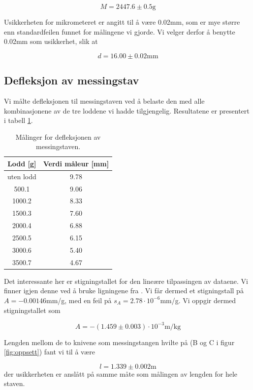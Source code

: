 \documentclass[a4paper,11pt, twocolumn]{article}
\begin{document}
\begin{equation}
	M = 2447.6\pm0.5\text{g}
\end{equation} 

Usikkerheten for mikrometeret er angitt til å være 0.02mm, som er mye større enn standardfeilen funnet for målingene vi gjorde. Vi velger derfor å benytte 0.02mm som usikkerhet, slik at

\begin{equation}
	d = 16.00\pm0.02\text{mm}
\end{equation}

\subsection{Defleksjon av messingstav}
Vi målte defleksjonen til messingstaven ved å belaste den med alle kombinasjonene av de tre loddene vi hadde tilgjengelig. Resultatene er presentert i tabell \ref{tab:defleksjon}.
\begin{table}[!ht]
\centering
\caption{Målinger for defleksjonen av messingstaven.}
\label{tab:defleksjon}
\begin{tabular}{cc}
	\toprule
	\toprule
	Lodd [g] & Verdi måleur [mm]\\
	\hline
	uten lodd & 9.78\\
	500.1 & 9.06\\
	1000.2 & 8.33\\
	1500.3 & 7.60\\
	2000.4 & 6.88\\
	2500.5 & 6.15\\
	3000.6 & 5.40\\
	3500.7 & 4.67\\
	\toprule
\end{tabular}
\end{table}

Det interessante her er stigningstallet for den lineære tilpassingen av dataene. Vi finner igjen denne ved å bruke ligningene fra \cite[s. 39]{squires}. Vi får dermed et stigningstall på $A = -0.00146$mm/g, med en feil på $s_A=2.78\cdot10^{-6}$mm/g. Vi oppgir dermed stigningstallet som

\begin{equation}
	A = -(1.459\pm0.003)\cdot10^{-3}\text{
m/kg}
\end{equation}

Lengden mellom de to knivene som messingstangen hvilte på (B og C i figur \ref{fig:oppsett}) fant vi til å være 

\begin{equation}
	l = 1.339\pm0.002\text{m}
\end{equation} 
der usikkerheten er anslått på samme måte som målingen av lengden for hele staven.
\end{document}
